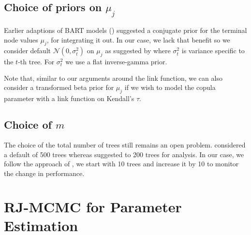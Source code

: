 \documentclass{amsart}
\begin{document}
\subsection{Choice of priors on $\mu_j$}
Earlier adaptions of BART models (\citet{chipman2010BART,Sparapani_BART,Murray03042021}) suggested a conjugate prior for the terminal node values $\mu_j$, for integrating it out. In our case, we lack that benefit so we consider default $\mathcal{N}(0,\sigma_{t}^2)$ on $\mu_j$ as suggested by \citet{chipman2010BART,Linero02012025} where $\sigma_{t}^2$ is variance specific to the $t$-th tree. For $\sigma_{t}^2$ we use a flat inverse-gamma prior.

Note that, similar to our arguments around the link function, we can also consider a transformed beta prior \cite{gokhale_prior_cor} for $\mu_j$ if we wish to model the copula parameter with a link function on Kendall's $\tau$.

\subsection{Choice of $m$} The choice of the total number of trees still remains an open problem. \citet{chipman2010BART} considered a default of 500 trees whereas \citet{Linero02012025} suggested to 200 trees for analysis. In our case, we follow the approach of \citet{serafini2024lossbasedpriortreetopologies}, we start with 10 trees and increase it by 10 to monitor the change in performance.

\section{RJ-MCMC for Parameter Estimation}\label{sec:rjmcmc}
\end{document}
